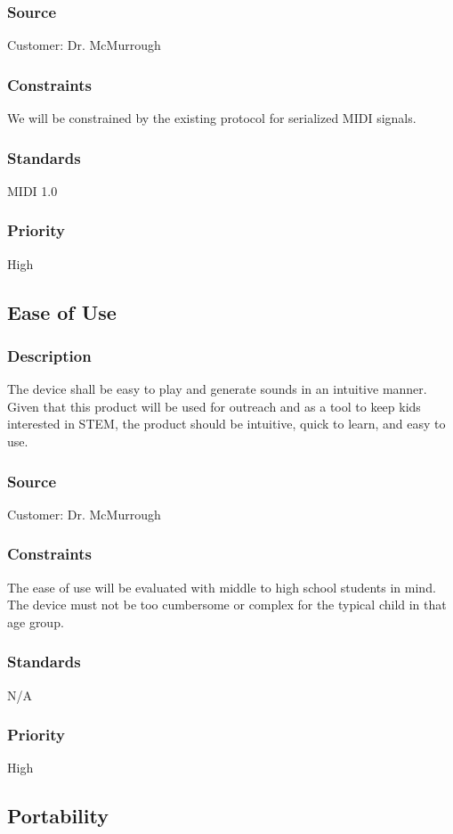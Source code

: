 \subsubsection{Source}
Customer: Dr. McMurrough
\subsubsection{Constraints}
We will be constrained by the existing protocol for serialized MIDI signals.
\subsubsection{Standards}
MIDI 1.0
\subsubsection{Priority}
High

\subsection{Ease of Use}
\subsubsection{Description}
The device shall be easy to play and generate sounds in an intuitive manner. Given that this product will be used for outreach and as a tool to keep kids interested in STEM, the product should be intuitive, quick to learn, and easy to use.
\subsubsection{Source}
Customer: Dr. McMurrough
\subsubsection{Constraints}
The ease of use will be evaluated with middle to high school students in mind. The device must not be too cumbersome or complex for the typical child in that age group.
\subsubsection{Standards}
N/A
\subsubsection{Priority}
High

\subsection{Portability}
